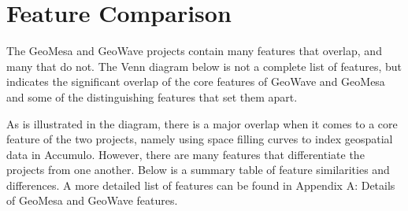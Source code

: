 \section{Feature Comparison}
\label{sec:featurecompare}

The GeoMesa and GeoWave projects contain many features that overlap, and many that do not.
The Venn diagram below is not a complete list of features, but indicates the significant overlap of the core features of GeoWave and GeoMesa and some of the distinguishing features that set them apart.

As is illustrated in the diagram, there is a major overlap when it comes to a core feature of the two projects, namely using space filling curves to index geospatial data in Accumulo.
However, there are many features that differentiate the projects from one another.
Below is a summary table of feature similarities and differences.
A more detailed list of features can be found in Appendix A: Details of GeoMesa and GeoWave features.





